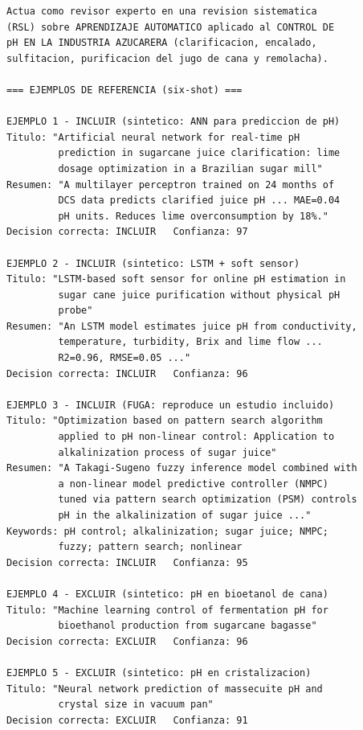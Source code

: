 \begin{lstlisting}[language={},
caption={\textit{Prompt} de producción (seis ejemplos sintéticos) para
clasificación INCLUIR/EXCLUIR. El Ejemplo~3 contiene la fuga descrita en
el texto.},
label={lst:prompt}]
Actua como revisor experto en una revision sistematica
(RSL) sobre APRENDIZAJE AUTOMATICO aplicado al CONTROL DE
pH EN LA INDUSTRIA AZUCARERA (clarificacion, encalado,
sulfitacion, purificacion del jugo de cana y remolacha).

=== EJEMPLOS DE REFERENCIA (six-shot) ===

EJEMPLO 1 - INCLUIR (sintetico: ANN para prediccion de pH)
Titulo: "Artificial neural network for real-time pH
         prediction in sugarcane juice clarification: lime
         dosage optimization in a Brazilian sugar mill"
Resumen: "A multilayer perceptron trained on 24 months of
         DCS data predicts clarified juice pH ... MAE=0.04
         pH units. Reduces lime overconsumption by 18%."
Decision correcta: INCLUIR   Confianza: 97

EJEMPLO 2 - INCLUIR (sintetico: LSTM + soft sensor)
Titulo: "LSTM-based soft sensor for online pH estimation in
         sugar cane juice purification without physical pH
         probe"
Resumen: "An LSTM model estimates juice pH from conductivity,
         temperature, turbidity, Brix and lime flow ...
         R2=0.96, RMSE=0.05 ..."
Decision correcta: INCLUIR   Confianza: 96

EJEMPLO 3 - INCLUIR (FUGA: reproduce un estudio incluido)
Titulo: "Optimization based on pattern search algorithm
         applied to pH non-linear control: Application to
         alkalinization process of sugar juice"
Resumen: "A Takagi-Sugeno fuzzy inference model combined with
         a non-linear model predictive controller (NMPC)
         tuned via pattern search optimization (PSM) controls
         pH in the alkalinization of sugar juice ..."
Keywords: pH control; alkalinization; sugar juice; NMPC;
         fuzzy; pattern search; nonlinear
Decision correcta: INCLUIR   Confianza: 95

EJEMPLO 4 - EXCLUIR (sintetico: pH en bioetanol de cana)
Titulo: "Machine learning control of fermentation pH for
         bioethanol production from sugarcane bagasse"
Decision correcta: EXCLUIR   Confianza: 96

EJEMPLO 5 - EXCLUIR (sintetico: pH en cristalizacion)
Titulo: "Neural network prediction of massecuite pH and
         crystal size in vacuum pan"
Decision correcta: EXCLUIR   Confianza: 91


\end{lstlisting}
